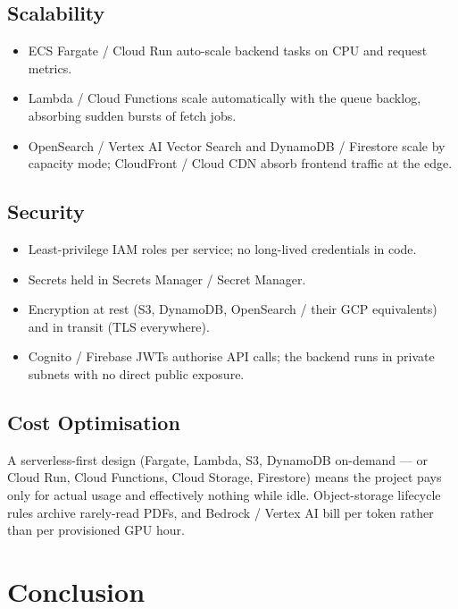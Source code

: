 \documentclass[12pt,a4paper]{article}
\begin{document}
\subsection{Scalability}
\begin{itemize}[leftmargin=2em, nosep]
    \item ECS Fargate / Cloud Run auto-scale backend tasks on CPU and request
          metrics.
    \item Lambda / Cloud Functions scale automatically with the queue
          backlog, absorbing sudden bursts of fetch jobs.
    \item OpenSearch / Vertex AI Vector Search and DynamoDB / Firestore scale
          by capacity mode; CloudFront / Cloud CDN absorb frontend traffic at
          the edge.
\end{itemize}

\subsection{Security}
\begin{itemize}[leftmargin=2em, nosep]
    \item Least-privilege IAM roles per service; no long-lived credentials in
          code.
    \item Secrets held in Secrets Manager / Secret Manager.
    \item Encryption at rest (S3, DynamoDB, OpenSearch / their GCP
          equivalents) and in transit (TLS everywhere).
    \item Cognito / Firebase JWTs authorise API calls; the backend runs in
          private subnets with no direct public exposure.
\end{itemize}

\subsection{Cost Optimisation}
A serverless-first design (Fargate, Lambda, S3, DynamoDB on-demand --- or
Cloud Run, Cloud Functions, Cloud Storage, Firestore) means the project pays
only for actual usage and effectively nothing while idle. Object-storage
lifecycle rules archive rarely-read PDFs, and Bedrock / Vertex AI bill per
token rather than per provisioned GPU hour.

\section{Conclusion}
\end{document}
